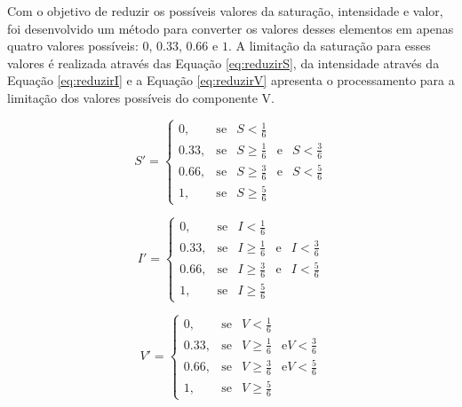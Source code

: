 \documentclass[	12pt, Times, openright, twoside, a4paper, english, brazil]{abntex2}
\begin{document}
Com o objetivo de reduzir os possíveis valores da saturação, intensidade e valor, foi desenvolvido um método para converter os valores desses elementos em apenas quatro valores possíveis: $0$, $0.33$, $0.66$ e $1$. A limitação da saturação para esses valores é realizada através das Equação \ref{eq:reduzirS}, da intensidade através da Equação \ref{eq:reduzirI} e a Equação \ref{eq:reduzirV} apresenta o processamento para a limitação dos valores possíveis do componente V.

\begin{equation}
\label{eq:reduzirS}
S'=\left\{
\begin{array}{rclcl}
       0,   &\mbox{se}  & S <    \frac{1}{6}                                    \\
    0.33,   &\mbox{se}  & S \geq \frac{1}{6} & \mbox{e} & S < \frac{3}{6}       \\
    0.66,   &\mbox{se}  & S \geq \frac{3}{6} & \mbox{e} & S < \frac{5}{6}       \\
       1,   &\mbox{se}  & S \geq \frac{5}{6}
\end{array}\right.
\end{equation}

\begin{equation}
\label{eq:reduzirI}
I'=\left\{
\begin{array}{rclcl}
       0,   &\mbox{se}  & I <    \frac{1}{6}                        \\
    0.33,   &\mbox{se}  & I \geq \frac{1}{6} & \mbox{e} & I < \frac{3}{6}      \\
    0.66,   &\mbox{se}  & I \geq \frac{3}{6} & \mbox{e} & I < \frac{5}{6}      \\
       1,   &\mbox{se}  & I \geq \frac{5}{6}
\end{array}\right.
\end{equation}

\begin{equation}
\label{eq:reduzirV}
V'=\left\{
\begin{array}{rclcl}
       0,   &\mbox{se}  & V <    \frac{1}{6}                                 \\
    0.33,   &\mbox{se}  & V \geq \frac{1}{6} & \mbox{e} V < \frac{3}{6}      \\
    0.66,   &\mbox{se}  & V \geq \frac{3}{6} & \mbox{e} V < \frac{5}{6}      \\
       1,   &\mbox{se}  & V \geq \frac{5}{6}
\end{array}\right.
\end{equation}
\end{document}
